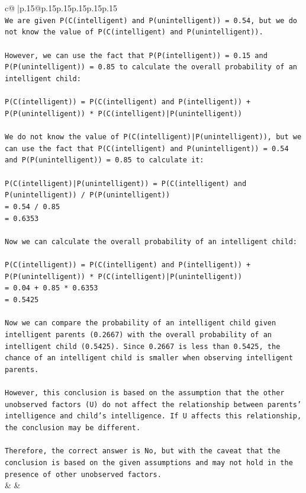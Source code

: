 \documentclass{article}
\begin{document}
{\begin{supertabular}{c@{$\;$}|p{.15\linewidth}@{}p{.15\linewidth}p{.15\linewidth}p{.15\linewidth}p{.15\linewidth}p{.15\linewidth}}
{{{\\ 
\texttt{We are given P(C(intelligent) and P(unintelligent)) = 0.54, but we do not know the value of P(C(intelligent) and P(unintelligent)).} \\
\\ 
\texttt{However, we can use the fact that P(P(intelligent)) = 0.15 and P(P(unintelligent)) = 0.85 to calculate the overall probability of an intelligent child:} \\
\\ 
\texttt{P(C(intelligent)) = P(C(intelligent) and P(intelligent)) + P(P(unintelligent)) * P(C(intelligent)|P(unintelligent))} \\
\\ 
\texttt{We do not know the value of P(C(intelligent)|P(unintelligent)), but we can use the fact that P(C(intelligent) and P(unintelligent)) = 0.54 and P(P(unintelligent)) = 0.85 to calculate it:} \\
\\ 
\texttt{P(C(intelligent)|P(unintelligent)) = P(C(intelligent) and P(unintelligent)) / P(P(unintelligent))} \\
\texttt{= 0.54 / 0.85} \\
\texttt{= 0.6353} \\
\\ 
\texttt{Now we can calculate the overall probability of an intelligent child:} \\
\\ 
\texttt{P(C(intelligent)) = P(C(intelligent) and P(intelligent)) + P(P(unintelligent)) * P(C(intelligent)|P(unintelligent))} \\
\texttt{= 0.04 + 0.85 * 0.6353} \\
\texttt{= 0.5425} \\
\\ 
\texttt{Now we can compare the probability of an intelligent child given intelligent parents (0.2667) with the overall probability of an intelligent child (0.5425). Since 0.2667 is less than 0.5425, the chance of an intelligent child is smaller when observing intelligent parents.} \\
\\ 
\texttt{However, this conclusion is based on the assumption that the other unobserved factors (U) do not affect the relationship between parents' intelligence and child's intelligence. If U affects this relationship, the conclusion may be different.} \\
\\ 
\texttt{Therefore, the correct answer is No, but with the caveat that the conclusion is based on the given assumptions and may not hold in the presence of other unobserved factors.} \\
            }
        }
    }
    & & \\ \\


\end{supertabular}}
\end{document}
